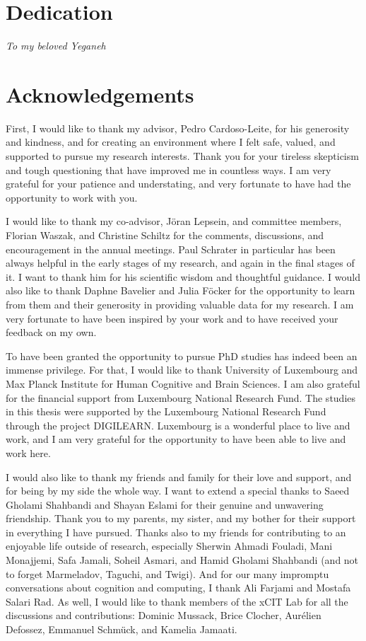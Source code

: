 \section*{Dedication}

\textit{To my beloved Yeganeh}

\newpage

\section*{Acknowledgements}

First, I would like to thank my advisor, Pedro Cardoso-Leite, for his generosity and kindness, and for creating an environment where I felt safe, valued, and supported to pursue my research interests. Thank you for your tireless skepticism and tough questioning that have improved me in countless ways. I am very grateful for your patience and understating, and very fortunate to have had the opportunity to work with you.

I would like to thank my co-advisor, Jöran Lepsein, and committee members, Florian Waszak, and Christine Schiltz for the comments, discussions, and encouragement in the annual meetings. Paul Schrater in particular has been always helpful in the early stages of my research, and again in the final stages of it. I want to thank him for his scientific wisdom and thoughtful guidance. I would also like to thank Daphne Bavelier and Julia Föcker for the opportunity to learn from them and their generosity in providing valuable data for my research. I am very fortunate to have been inspired by your work and to have received your feedback on my own.

To have been granted the opportunity to pursue PhD studies has indeed been an immense privilege. For that, I would like to thank University of Luxembourg and Max Planck Institute for Human Cognitive and Brain Sciences. I am also grateful for the financial support from Luxembourg National Research Fund. The studies in this thesis were supported by the Luxembourg National Research Fund through the project DIGILEARN. Luxembourg is a wonderful place to live and work, and I am very grateful for the opportunity to have been able to live and work here.

I would also like to thank my friends and family for their love and support, and for being by my side the whole way. I want to extend a special thanks to Saeed Gholami Shahbandi and Shayan Eslami for their genuine and unwavering friendship. Thank you to my parents, my sister, and my bother for their support in everything I have pursued. Thanks also to my friends for contributing to an enjoyable life outside of research, especially Sherwin Ahmadi Fouladi, Mani Monajjemi, Safa Jamali, Soheil Asmari, and Hamid Gholami Shahbandi (and not to forget Marmeladov, Taguchi, and Twigi). And for our many impromptu conversations about cognition and computing, I thank Ali Farjami and Mostafa Salari Rad. As well, I would like to thank members of the xCIT Lab for all the discussions and contributions: Dominic Mussack, Brice Clocher, Aurélien Defossez, Emmanuel Schmück, and Kamelia Jamaati.


